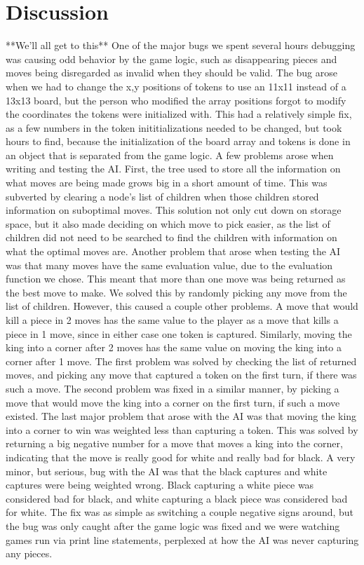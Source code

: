 \documentclass{article}
\begin{document}
\section{Discussion}
**We'll all get to this**
	One of the major bugs we spent several hours debugging was causing odd behavior by the game logic, such as disappearing pieces and moves being disregarded as invalid when they should be valid. The bug arose when we had to change the x,y positions of tokens to use an 11x11 instead of a 13x13 board, but the person who modified the array positions forgot to modify the coordinates the tokens were initialized with. This had a relatively simple fix, as a few numbers in the token inititializations needed to be changed, but took hours to find, because the initialization of the board array and tokens is done in an object that is separated from the game logic. 
	A few problems arose when writing and testing the AI. First, the tree used to store all the information on what moves are being made grows big in a short amount of time. This was subverted by clearing a node's list of children when those children stored information on suboptimal moves. This solution not only cut down on storage space, but it also made deciding on which move to pick easier, as the list of children did not need to be searched to find the children with information on what the optimal moves are. Another problem that arose when testing the AI was that many moves have the same evaluation value, due to the evaluation function we chose. This meant that more than one move was being returned as the best move to make. We solved this by randomly picking any move from the list of children. However, this caused a couple other problems. A move that would kill a piece in 2 moves has the same value to the player as a move that kills a piece in 1 move, since in either case one token is captured. Similarly, moving the king into a corner after 2 moves has the same value on moving the king into a corner after 1 move. The first problem was solved by checking the list of returned moves, and picking any move that captured a token on the first turn, if there was such a move. The second problem was fixed in a similar manner, by picking a move that would move the king into a corner on the first turn, if such a move existed. The last major problem that arose with the AI was that moving the king into a corner to win was weighted less than capturing a token. This was solved by returning a big negative number for a move that moves a king into the corner, indicating that the move is really good for white and really bad for black. A very minor, but serious, bug with the AI was that the black captures and white captures were being weighted wrong. Black capturing a white piece was considered bad for black, and white capturing a black piece was considered bad for white. The fix was as simple as switching a couple negative signs around, but the bug was only caught after the game logic was fixed and we were watching games run via print line statements, perplexed at how the AI was never capturing any pieces.
\end{document}
